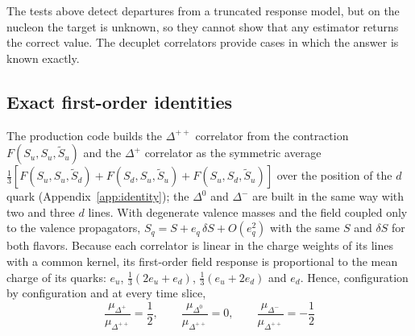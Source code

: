 \documentclass[aps,prd,reprint,twocolumn,superscriptaddress,nofootinbib,longbibliography]{revtex4-2}
\begin{document}
The tests above detect departures from a truncated response model, but on the nucleon the target is unknown, so they cannot show that any estimator returns the correct value. The decuplet correlators provide cases in which the answer is known exactly.

\subsection{Exact first-order identities}

The production code builds the $\Delta^{++}$ correlator from the contraction $F(S_u,S_u,\tilde S_u)$ and the $\Delta^+$ correlator as the symmetric average $\tfrac13[F(S_u,S_u,\tilde S_d)+F(S_d,S_u,\tilde S_u)+F(S_u,S_d,\tilde S_u)]$ over the position of the $d$ quark (Appendix~\ref{app:identity}); the $\Delta^0$ and $\Delta^-$ are built in the same way with two and three $d$ lines. With degenerate valence masses and the field coupled only to the valence propagators, $S_q=S+e_q\,\delta S+O(e_q^2)$ with the same $S$ and $\delta S$ for both flavors. Because each correlator is linear in the charge weights of its lines with a common kernel, its first-order field response is proportional to the mean charge of its quarks: $e_u$, $\tfrac13(2e_u+e_d)$, $\tfrac13(e_u+2e_d)$ and $e_d$. Hence, configuration by configuration and at every time slice,
\begin{equation}
\frac{\mu_{\Delta^+}}{\mu_{\Delta^{++}}}=\frac12,\qquad \frac{\mu_{\Delta^0}}{\mu_{\Delta^{++}}}=0,\qquad \frac{\mu_{\Delta^-}}{\mu_{\Delta^{++}}}=-\frac12
\label{eq:deltaratio}
\end{equation}
\end{document}
